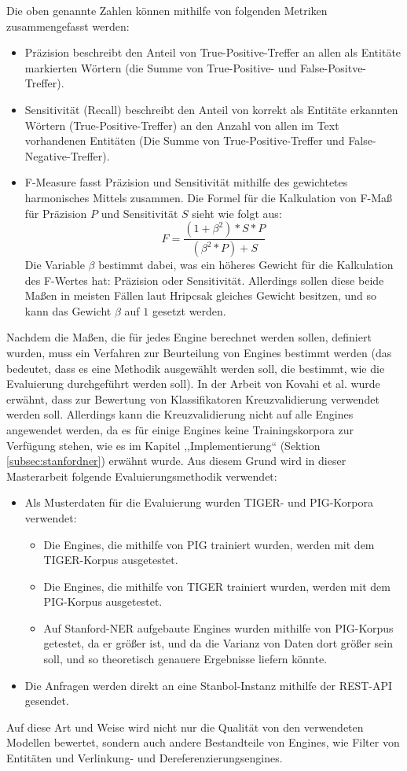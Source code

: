 Die oben genannte Zahlen können mithilfe von folgenden Metriken zusammengefasst werden\cite{och2003systematic}:
\begin{itemize}
\item Präzision beschreibt den Anteil von True-Positive-Treffer an allen als Entitäte markierten Wörtern (die Summe von True-Positive- und False-Positve-Treffer).
\item Sensitivität (Recall) beschreibt den Anteil von korrekt als Entitäte erkannten Wörtern (True-Positive-Treffer) an den Anzahl von allen im Text vorhandenen Entitäten (Die Summe von True-Positive-Treffer und False-Negative-Treffer).
\item F-Measure fasst Präzision und Sensitivität mithilfe des gewichtetes harmonisches Mittels zusammen. Die Formel für die Kalkulation von F-Maß für Präzision $P$ und Sensitivität $S$ sieht wie folgt aus\cite{hripcsak2005agreement}:
$$
F=\frac{(1+\beta^2)*S*P}{(\beta^2*P)+S}
$$ 
Die Variable $\beta$ bestimmt dabei, was ein höheres Gewicht für die Kalkulation des F-Wertes hat: Präzision oder Sensitivität. Allerdings sollen diese beide Maßen in meisten Fällen laut Hripcsak\cite{hripcsak2005agreement} gleiches Gewicht besitzen, und so kann das Gewicht $\beta$ auf $1$ gesetzt werden.
\end{itemize}

Nachdem die Maßen, die für jedes Engine berechnet werden sollen, definiert wurden, muss ein Verfahren zur Beurteilung von Engines bestimmt werden (das bedeutet, dass es eine Methodik ausgewählt werden soll, die bestimmt, wie die Evaluierung durchgeführt werden soll). In der Arbeit von Kovahi et al.\cite{kohavi1995study} wurde erwähnt, dass zur Bewertung von Klassifikatoren Kreuzvalidierung verwendet werden soll. Allerdings kann die Kreuzvalidierung nicht auf alle Engines angewendet werden, da es für einige Engines keine Trainingskorpora zur Verfügung stehen, wie es im Kapitel ,,Implementierung`` (Sektion \ref{subsec:stanfordner}) erwähnt wurde. Aus diesem Grund wird in dieser Masterarbeit folgende Evaluierungsmethodik verwendet:
\begin{itemize}
\item Als Musterdaten für die Evaluierung wurden TIGER- und PIG-Korpora verwendet:
\begin{itemize}
\item Die Engines, die mithilfe von PIG trainiert wurden, werden mit dem TIGER-Korpus ausgetestet.
\item Die Engines, die mithilfe von TIGER trainiert wurden, werden mit dem PIG-Korpus ausgetestet.
\item Auf Stanford-NER aufgebaute Engines wurden mithilfe von PIG-Korpus getestet, da er größer ist, und da die Varianz von Daten dort größer sein soll, und so theoretisch genauere Ergebnisse liefern könnte.
\end{itemize}
\item Die Anfragen werden direkt an eine Stanbol-Instanz mithilfe der REST-API gesendet.
\end{itemize}
Auf diese Art und Weise wird nicht nur die Qualität von den verwendeten Modellen bewertet, sondern auch andere Bestandteile von Engines, wie Filter von Entitäten und Verlinkung- und Dereferenzierungsengines.

